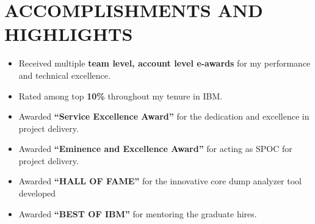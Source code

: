 \documentclass{system}
\begin{document}
\begin{resume}
\begin{itemize}
 \end{itemize}

\vspace{5pt}
\section {ACCOMPLISHMENTS AND HIGHLIGHTS}
\hrulefill
\begin{itemize} \itemsep 2pt
\item Received multiple {\bfseries team level, account level e-awards} for my performance
and technical excellence.
\item Rated among top {\bfseries 10\%} throughout my tenure in IBM.
\item Awarded {\bfseries “Service Excellence Award”} for the dedication and excellence in
project delivery.
\item Awarded {\bfseries “Eminence and Excellence Award”} for acting as SPOC for project
delivery.
\item Awarded {\bfseries “HALL OF FAME”} for the innovative core dump analyzer tool developed
\item Awarded {\bfseries “BEST OF IBM”} for mentoring the graduate hires.
\end{itemize}
 
 
\end{resume} 
\end{document}
